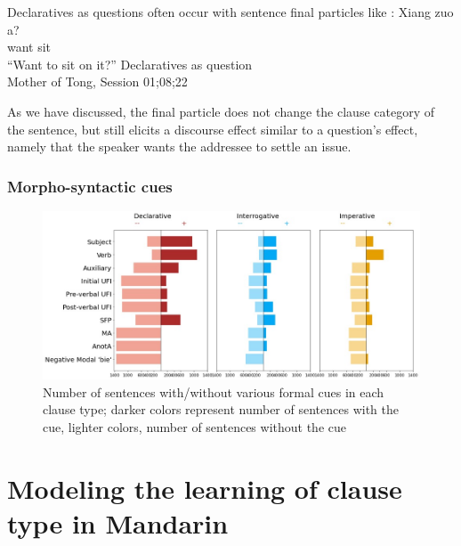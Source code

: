 Declaratives as questions often occur with sentence final particles like :
\gll %
Xiang zuo a?\\
want sit \Sfp{}\\
``Want to sit on it?''
\hfill Declaratives as question\\
Mother of Tong, Session 01;08;22
\eex

As we have discussed, the final particle  does not change the clause category of the sentence, but still elicits a discourse effect similar to a question's effect, namely that the speaker wants the addressee to settle an issue.

\subsubsection{Morpho-syntactic cues}
\label{sec:mancl:corpus:results:syn}


\begin{figure}[H]
    \centering
    \includegraphics[width=1\textwidth]{figures/man-real-syncluster.jpg}
    \caption{Number of sentences with/without various formal cues in each clause type; darker colors represent number of sentences with the cue, lighter colors, number of sentences without the cue }
    \label{fig:man-real-syncluster}
\end{figure}




\section{Modeling the learning of clause type in 
Mandarin}
\label{sec:mancl:model}

